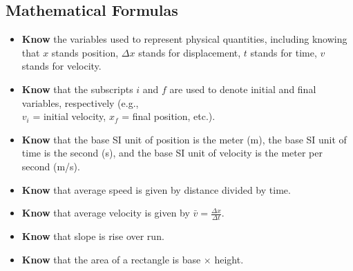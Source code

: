 \documentclass[dvipsnames]{article}
\begin{document}
\subsection*{Mathematical Formulas} %

\begin{itemize}[itemsep=0pt,topsep=-3pt]
    \item \textbf{Know} the variables used to represent physical quantities, including knowing that $x$ stands position, $\Delta x$ stands for displacement, $t$ stands for time, $v$ stands for velocity.
    \item \textbf{Know} that the subscripts $i$ and $f$ are used to denote initial and final variables, respectively (e.g.,\\$v_i$ = initial velocity, $x_f$ = final position, etc.).
    \item \textbf{Know} that the base SI unit of position is the meter (m), the base SI unit of time is the second (s), and the base SI unit of velocity is the meter per second (m/s).
    \item \textbf{Know} that average speed is given by distance divided by time.
    \item \textbf{Know} that average velocity is given by $\displaystyle \bar{v} = \frac{\Delta x}{\Delta t}$.
    \item \textbf{Know} that slope is rise over run.

    \begin{center}
    \end{center}

    \item \textbf{Know} that the area of a rectangle is base $\times$ height.

    \begin{center}
    \end{center}
\end{itemize}
\end{document}
